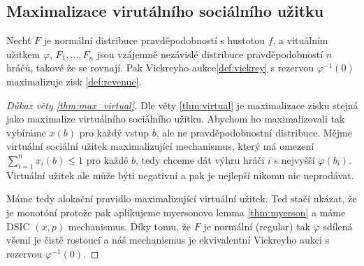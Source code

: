 \subsection{Maximalizace virutálního sociálního užitku}
\begin{theorem}\label{thm:max_virtual}
  Nechť $F$ je normální distribuce pravděpodobností s hustotou $f$, a vituálním užitkem $\varphi$, $F_1, \dots,F_n$ jsou vzájemně nezávislé distribuce pravděpodobností $n$ hráčů, takové že se rovnají. 
  Pak Vickreyho aukce\ref{def:vickrey} s rezervou $\varphi^{-1} (0)$ maximalizuje zisk \ref{def:revenue}. 
\end{theorem}
\begin{proof}[Důkaz věty \ref{thm:max_virtual}]
    Dle věty \ref{thm:virtual} je maximalizace zisku stejná jako maximalize virtuálního sociálního užitku.
    Abychom ho maximalizovali tak vybíráme $x(b)$ pro každý vstup $b$, ale ne pravděpodobnostní distribuce. 
    Mějme virtuální sociální užitek maximalizující mechanismus, který má omezení $\sum^n_{i=1}x_i(b) \leq 1$ pro každé $b$, tedy chceme dát výhru hráči $i$ s nejvyšší $\varphi(b_i)$. 
    Virtuální užitek ale může býti negativní a pak je nejlepší nikomu nic neprodávat. 

    Máme tedy alokační pravidlo maximalizující virtuální užitek. 
    Ted stačí ukázat, že je monotóní protože pak aplikujeme myersonovo lemma \ref{thm:myerson} a máme DSIC $(x,p)$ mechanismus. 
    Díky tomu, že $F$ je normální (regular) tak $\varphi$ sdílená všemi je čistě rostoucí a náš mechanismus je ekvivalentní Vickreyho aukci s rezervou $\varphi^{-1}(0)$. 
\end{proof}
